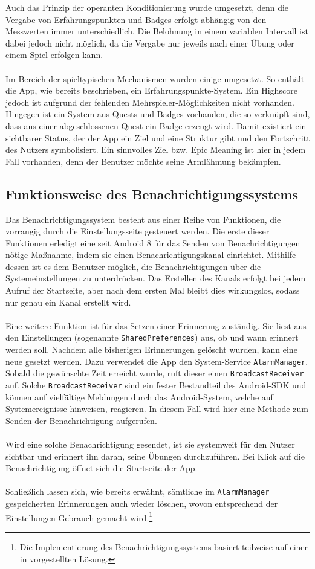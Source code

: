 Auch das Prinzip der operanten Konditionierung wurde umgesetzt, denn die Vergabe von Erfahrungspunkten und Badges erfolgt abhängig von den Messwerten immer unterschiedlich. Die Belohnung in einem variablen Intervall ist dabei jedoch nicht möglich, da die Vergabe nur jeweils nach einer Übung oder einem Spiel erfolgen kann. \\ \\
Im Bereich der spieltypischen Mechanismen wurden einige umgesetzt. So enthält die App, wie bereits beschrieben, ein Erfahrungspunkte-System. Ein Highscore jedoch ist aufgrund der fehlenden Mehrspieler-Möglichkeiten nicht vorhanden. Hingegen ist ein System aus Quests und Badges vorhanden, die so verknüpft sind, dass aus einer abgeschlossenen Quest ein Badge erzeugt wird. Damit existiert ein sichtbarer Status, der der App ein Ziel und eine Struktur gibt und den Fortschritt des Nutzers symbolisiert. Ein sinnvolles Ziel bzw. Epic Meaning ist hier in jedem Fall vorhanden, denn der Benutzer möchte seine Armlähmung bekämpfen.
\subsection{Funktionsweise des Benachrichtigungssystems}
Das Benachrichtigungssystem besteht aus einer Reihe von Funktionen, die vorrangig durch die Einstellungsseite gesteuert werden. Die erste dieser Funktionen erledigt eine seit Android 8 für das Senden von Benachrichtigungen nötige Maßnahme, indem sie einen Benachrichtigungskanal einrichtet. Mithilfe dessen ist es dem Benutzer möglich, die Benachrichtigungen über die Systemeinstellungen zu unterdrücken.\cite{Src:AndroidNotify} Das Erstellen des Kanals erfolgt bei jedem Aufruf der Startseite, aber nach dem ersten Mal bleibt dies wirkungslos, sodass nur genau ein Kanal erstellt wird. \\ \\
Eine weitere Funktion ist für das Setzen einer Erinnerung zuständig. Sie liest aus den Einstellungen (sogenannte \texttt{SharedPreferences}) aus, ob und wann erinnert werden soll. Nachdem alle bisherigen Erinnerungen gelöscht wurden, kann eine neue gesetzt werden. Dazu verwendet die App den System-Service \texttt{AlarmManager}\cite{Src:NotifyDroid}. Sobald die gewünschte Zeit erreicht wurde, ruft dieser einen \texttt{BroadcastReceiver} auf. Solche \texttt{BroadcastReceiver} sind ein fester Bestandteil des Android-SDK und können auf vielfältige Meldungen durch das Android-System, welche auf Systemereignisse hinweisen, reagieren.\cite{Src:AndroidKuenneth} In diesem Fall wird hier eine Methode zum Senden der Benachrichtigung aufgerufen. \\ \\
Wird eine solche Benachrichtigung gesendet, ist sie systemweit für den Nutzer sichtbar und erinnert ihn daran, seine Übungen durchzuführen. Bei Klick auf die Benachrichtigung öffnet sich die Startseite der App. \\ \\
Schließlich lassen sich, wie bereits erwähnt, sämtliche im \texttt{AlarmManager} gespeicherten Erinnerungen auch wieder löschen, wovon entsprechend der Einstellungen Gebrauch gemacht wird.\footnote[3]{Die Implementierung des Benachrichtigungssystems basiert teilweise auf einer in  \cite{Src:NotifyDroid} vorgestellten Lösung.}